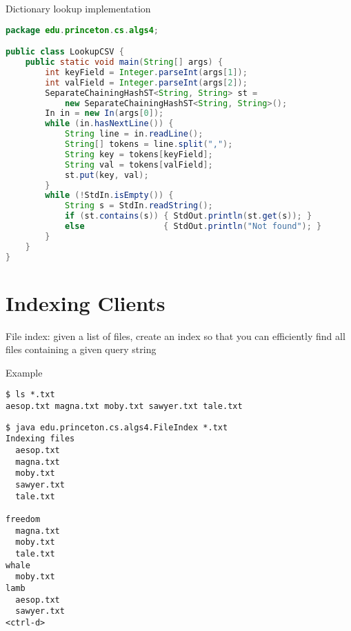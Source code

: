 \documentclass[8pt,a4paper,compress]{beamer}
\begin{document}
\begin{frame}[fragile]
Dictionary lookup implementation
\begin{lstlisting}[language=java,style=focusin]
package edu.princeton.cs.algs4;

public class LookupCSV {
    public static void main(String[] args) {
        int keyField = Integer.parseInt(args[1]);
        int valField = Integer.parseInt(args[2]);
        SeparateChainingHashST<String, String> st = 
            new SeparateChainingHashST<String, String>();
        In in = new In(args[0]);
        while (in.hasNextLine()) {
            String line = in.readLine();
            String[] tokens = line.split(",");
            String key = tokens[keyField];
            String val = tokens[valField];
            st.put(key, val);
        }
        while (!StdIn.isEmpty()) {
            String s = StdIn.readString();
            if (st.contains(s)) { StdOut.println(st.get(s)); }
            else                { StdOut.println("Not found"); }
        }
    }
}
\end{lstlisting}
\end{frame}

\section{Indexing Clients}
\begin{frame}[fragile]
\pause

File index: given a list of files, create an index so that you can efficiently find all files containing a given query string

\pause
\bigskip

Example
\begin{lstlisting}[language={}]
$ ls *.txt
aesop.txt magna.txt moby.txt sawyer.txt tale.txt 
\end{lstlisting}

\begin{lstlisting}[language={}]
$ java edu.princeton.cs.algs4.FileIndex *.txt
Indexing files
  aesop.txt 
  magna.txt 
  moby.txt 
  sawyer.txt 
  tale.txt 

freedom
  magna.txt 
  moby.txt 
  tale.txt
whale
  moby.txt
lamb
  aesop.txt
  sawyer.txt 
<ctrl-d>
\end{lstlisting}
\end{frame}
\end{document}
